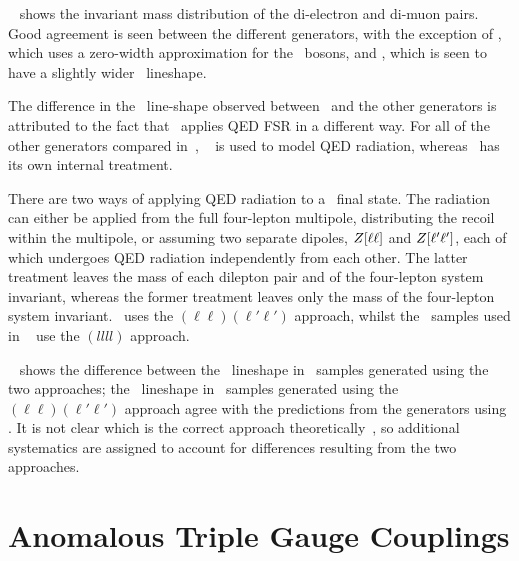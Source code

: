 ~ shows the invariant mass distribution of the di-electron and
di-muon pairs. Good agreement is seen between the different generators, with
the exception of \mcatnlo, which uses a zero-width approximation for the \Z\
bosons, and \sherpa, which is seen to have a slightly wider \Z\ lineshape.

The difference in the \Z\ line-shape observed between \sherpa\ and the other
generators is attributed to the fact that \sherpa\ applies QED FSR in a
different way. For all of the other generators compared in~, 
\photos~\cite{Golonka:2005pn} is used
to model QED radiation, whereas \sherpa\ has its own internal treatment. 

There are two
ways of applying QED radiation to a \ZZllll\ final state. The radiation can
either be applied from the full four-lepton multipole, distributing the recoil within
the multipole, or assuming two separate dipoles, $Z[\ell\ell]$ and
$Z[\ell'\ell']$, each
of which undergoes QED radiation independently from each other. The latter
treatment leaves the mass of each dilepton pair and of the four-lepton system invariant, whereas the former
treatment leaves only the mass of the four-lepton system invariant. \photos\ uses the
$(\ell\ell)(\ell'\ell')$ approach, whilst the \sherpa\ samples used in
~\fig{gen-comp-mZ}
use the $(llll)$ approach. 

~ shows the difference 
between the \Z\
lineshape in \sherpa\ samples generated using the two approaches; the \Z\
lineshape in \sherpa\ samples generated using the $(\ell\ell)(\ell'\ell')$ approach agree with the predictions from the generators using \photos. It is not  clear which is the correct approach
theoretically~\cite{Siegert}, so additional systematics are assigned to account
for differences resulting from the two approaches.

\section{Anomalous Triple Gauge Couplings}

